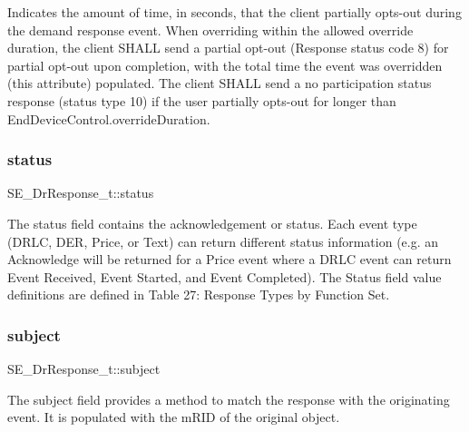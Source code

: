 Indicates the amount of time, in seconds, that the client partially opts-\/out during the demand response event. When overriding within the allowed override duration, the client S\+H\+A\+LL send a partial opt-\/out (Response status code 8) for partial opt-\/out upon completion, with the total time the event was overridden (this attribute) populated. The client S\+H\+A\+LL send a no participation status response (status type 10) if the user partially opts-\/out for longer than End\+Device\+Control.\+override\+Duration. \mbox{\label{group__DrResponse_gacdaed09d4ca83cb5ca0c9a05403d075c}} 
\subsubsection{\texorpdfstring{status}{status}}
{\footnotesize\ttfamily S\+E\+\_\+\+Dr\+Response\+\_\+t\+::status}

The status field contains the acknowledgement or status. Each event type (D\+R\+LC, D\+ER, Price, or Text) can return different status information (e.\+g. an Acknowledge will be returned for a Price event where a D\+R\+LC event can return Event Received, Event Started, and Event Completed). The Status field value definitions are defined in Table 27\+: Response Types by Function Set. \mbox{\label{group__DrResponse_gac4dc2f090a45b58f5379fc0566b52b3e}} 
\subsubsection{\texorpdfstring{subject}{subject}}
{\footnotesize\ttfamily S\+E\+\_\+\+Dr\+Response\+\_\+t\+::subject}

The subject field provides a method to match the response with the originating event. It is populated with the m\+R\+ID of the original object. 